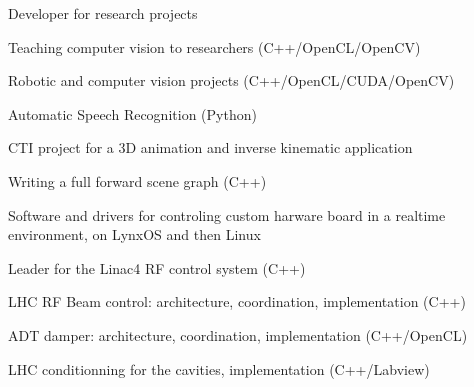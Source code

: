 \documentclass[a4paper]{deedy-resume} %
\begin{document}
\begin{minipage}[t]{0.66\textwidth}
\sectionspace %


	Developer for research projects
	\begin{tightitemize}
		\item Teaching computer vision to researchers (C++/OpenCL/OpenCV)
		\item Robotic and computer vision projects (C++/OpenCL/CUDA/OpenCV)
		\item Automatic Speech Recognition (Python)
	\end{tightitemize}

\sectionspace %


	CTI project for a 3D animation and inverse kinematic application
	\begin{tightitemize}
		\item Writing a full forward scene graph (C++)
	\end{tightitemize}

\sectionspace %


	Software and drivers for controling custom harware board in a realtime
	environment, on LynxOS and then Linux
	\begin{tightitemize}
		\item Leader for the Linac4 RF control system (C++)
		\item LHC RF Beam control: architecture, coordination, implementation (C++)
		\item ADT damper: architecture, coordination, implementation (C++/OpenCL)
		\item LHC conditionning for the cavities, implementation (C++/Labview)
	\end{tightitemize}

\sectionspace %



\end{minipage}
\end{document}
